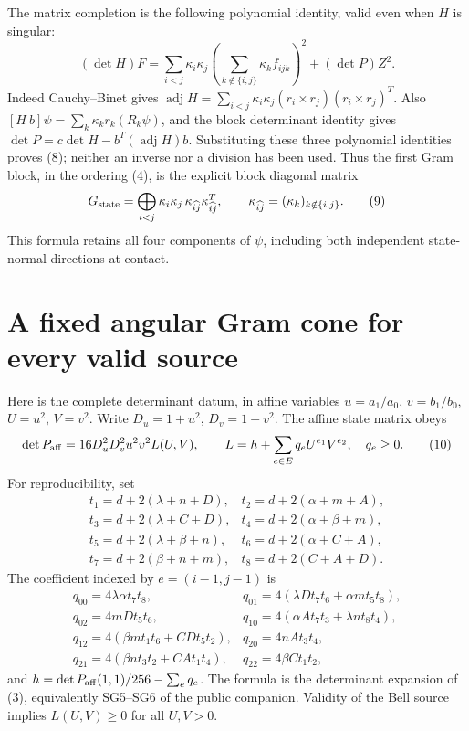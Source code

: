 \documentclass[11pt]{article}
\newcommand{\adj}{\operatorname{adj}}
\begin{document}
The matrix completion is the following polynomial identity, valid even
when $H$ is singular:
\[
 (\det H)F=
 \sum_{i<j}\kappa_i\kappa_j
       \left(\sum_{k\notin\{i,j\}}\kappa_k f_{ijk}\right)^2
                  +(\det P)Z^2.                      \tag{8}
\]
Indeed Cauchy--Binet gives
$\adj H=\sum_{i<j}\kappa_i\kappa_j
(r_i\times r_j)(r_i\times r_j)^T$.
Also $[H\ b]\psi=\sum_k\kappa_k r_k(R_k\psi)$, and the block determinant
identity gives
$\det P=c\det H-b^T(\adj H)b$.
Substituting these three polynomial identities proves (8); neither an
inverse nor a division has been used.  Thus the first Gram block, in the
ordering (4), is the explicit block diagonal matrix
\[
 G_{\rm state}=
 \bigoplus_{i<j}\kappa_i\kappa_j\,\kappa_{\widehat{ij}}
                       \kappa_{\widehat{ij}}^T,
 \qquad \kappa_{\widehat{ij}}=(\kappa_k)_{k\notin\{i,j\}}.
                                                               \tag{9}
\]
This formula retains all four components of $\psi$, including both
independent state-normal directions at contact.

\section{A fixed angular Gram cone for every valid source}

Here is the complete determinant datum, in affine variables
$u=a_1/a_0$, $v=b_1/b_0$, $U=u^2$, $V=v^2$.
Write $D_u=1+u^2$, $D_v=1+v^2$.  The affine state matrix obeys
\[
 \det P_{\rm aff}=16D_u^2D_v^2u^2v^2 L(U,V),
 \qquad L=h+\sum_{e\in E}q_e U^{e_1}V^{e_2},\quad q_e\geq0.
                                                               \tag{10}
\]
For reproducibility, set
\[
\begin{array}{ll}
t_1=d+2(\lambda+n+D),&t_2=d+2(\alpha+m+A),\\
t_3=d+2(\lambda+C+D),&t_4=d+2(\alpha+\beta+m),\\
t_5=d+2(\lambda+\beta+n),&t_6=d+2(\alpha+C+A),\\
t_7=d+2(\beta+n+m),&t_8=d+2(C+A+D).
\end{array}
\]
The coefficient indexed by $e=(i-1,j-1)$ is
\[
\begin{array}{ll}
q_{00}=4\lambda\alpha t_7t_8,&
q_{01}=4(\lambda Dt_7t_6+\alpha mt_5t_8),\\
q_{02}=4mDt_5t_6,&
q_{10}=4(\alpha At_7t_3+\lambda nt_8t_4),\\
q_{12}=4(\beta mt_1t_6+CDt_5t_2),&
q_{20}=4nAt_3t_4,\\
q_{21}=4(\beta nt_3t_2+CAt_1t_4),&
q_{22}=4\beta Ct_1t_2,
\end{array}
\]
and $h=\det P_{\rm aff}(1,1)/256-\sum_e q_e$.
The formula is the determinant expansion of (3), equivalently SG5--SG6
of the public companion.  Validity of the Bell source implies
$L(U,V)\geq0$ for all $U,V>0$.
\end{document}
